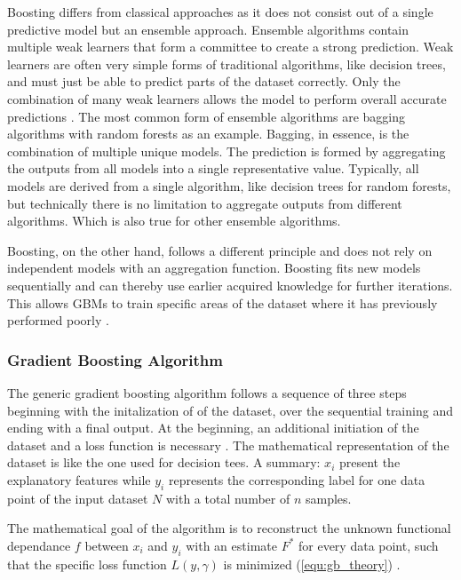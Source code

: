 Boosting differs from classical approaches as it does not consist out of a single predictive 
model but an ensemble approach. Ensemble algorithms contain multiple weak learners that form a 
committee to create a strong prediction. Weak learners are often very simple forms of traditional 
algorithms, like decision trees, and must just be able to predict parts of the dataset correctly. 
Only the combination of many weak learners allows the model to perform overall accurate 
predictions \cite{parr2022gb_explained_dtt}. The most common form of ensemble algorithms are bagging algorithms with random 
forests as an example. Bagging, in essence, is the combination of multiple unique models. The 
prediction is formed by aggregating the outputs from all models into a single representative 
value. Typically, all models are derived from a single algorithm, like decision trees for random 
forests, but technically there is no limitation to aggregate outputs from different algorithms. 
Which is also true for other ensemble algorithms. 

Boosting, on the other hand, follows a different principle and does not rely on independent 
models with an aggregation function. Boosting fits new models sequentially and can thereby use 
earlier acquired knowledge for further iterations. This allows GBMs to train specific areas of 
the dataset where it has previously performed poorly \cite[p.345f]{James2021}.  

\subsubsection{Gradient Boosting Algorithm}
\label{sec:Gradient Boosting Algorithm}

The generic gradient boosting algorithm follows a sequence of three steps beginning with the initalization of
of the dataset, over the sequential training and ending with a final output. At the beginning, an 
additional initiation of the dataset and a loss function is necessary \cite{parr2022gb_explained_hrd}. The mathematical 
representation of the dataset is like the one used for decision tees. A summary: \(x_{i}\) present the 
explanatory features while \(y_{i}\) represents the corresponding label for one data point of the input 
dataset \(N\) with a total number of \(n\) samples. 

The mathematical goal of the algorithm is to reconstruct the unknown functional dependance \(f\) 
between \(x_{i}\) and \(y_{i}\) with an estimate \(F^{*}\) for every data point, such that the specific loss 
function \(L(y, \gamma)\) is minimized (\ref{equ:gb_theory}) \cite[p.1189]{Friedman_2001} \cite[2.1]{Natekin2013}. 

